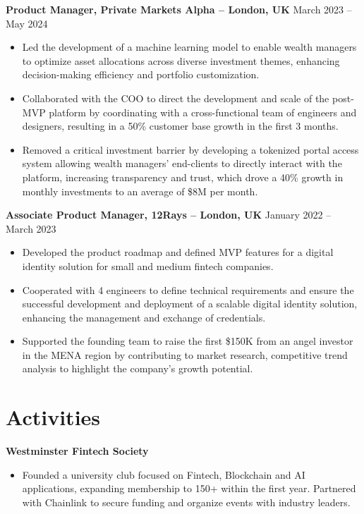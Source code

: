 \documentclass{article}
\begin{document}
\noindent
\textbf{Product Manager, Private Markets Alpha -- London, UK} \hfill March 2023 -- May 2024
\begin{itemize}[leftmargin=*,noitemsep,topsep=0pt]
    \item Led the development of a machine learning model to enable wealth managers to optimize asset allocations across diverse investment themes, enhancing decision-making efficiency and portfolio customization.
    \item Collaborated with the COO to direct the development and scale of the post-MVP platform by coordinating with a cross-functional team of engineers and designers, resulting in a 50\% customer base growth in the first 3 months.
    \item Removed a critical investment barrier by developing a tokenized portal access system allowing wealth managers' end-clients to directly interact with the platform, increasing transparency and trust, which drove a 40\% growth in monthly investments to an average of \$8M per month.
\end{itemize}

\noindent
\textbf{Associate Product Manager, 12Rays -- London, UK} \hfill January 2022 -- March 2023
\begin{itemize}[leftmargin=*,noitemsep,topsep=0pt]
    \item Developed the product roadmap and defined MVP features for a digital identity solution for small and medium fintech companies.
    \item Cooperated with 4 engineers to define technical requirements and ensure the successful development and deployment of a scalable digital identity solution, enhancing the management and exchange of credentials.
    \item Supported the founding team to raise the first \$150K from an angel investor in the MENA region by contributing to market research, competitive trend analysis to highlight the company's growth potential.
\end{itemize}

\section*{Activities}
\noindent
\textbf{Westminster Fintech Society}
\begin{itemize}[leftmargin=*,noitemsep,topsep=0pt]
    \item Founded a university club focused on Fintech, Blockchain and AI applications, expanding membership to 150+ within the first year. Partnered with Chainlink to secure funding and organize events with industry leaders.
\end{itemize}
\end{document}
